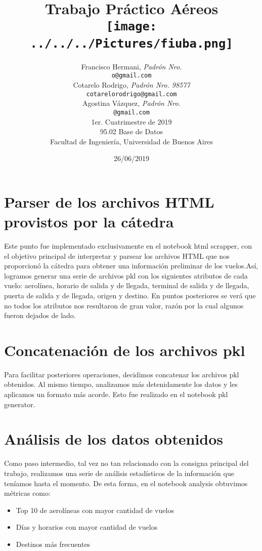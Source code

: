 \documentclass[a4paper,11pt]{article}
\title{\textbf{Trabajo Práctico Aéreos} \\[1cm] \texttt{[image: ../../../Pictures/fiuba.png]}}
\author{	Francisco Hermani, \textit{Padrón Nro. }                     \\
            \texttt{ o@gmail.com }                                              \\[2.5ex]
            Cotarelo Rodrigo, \textit{Padrón Nro. 98577}                     \\
            \texttt{ cotarelorodrigo@gmail.com }                                              \\[2.5ex]
			Agostina Vázquez, \textit{Padrón Nro. }                    
\\
            \texttt{ @gmail.com }                                              \\[2.5ex]
            \normalsize{1er. Cuatrimestre de 2019}                                      \\
            \normalsize{95.02 Base de Datos}  \\
            \normalsize{Facultad de Ingeniería, Universidad de Buenos Aires}            \\
       }
\date{26/06/2019}
\begin{document}
\maketitle
\thispagestyle{empty}   %
\newpage

\section{Parser de los archivos HTML provistos por la cátedra}
Este punto fue implementado exclusivamente en el notebook html scrapper, con el objetivo principal de interpretar y parsear los archivos HTML que nos proporcionó la cátedra para obtener una información preliminar de los vuelos.Así, logramos generar una serie de archivos pkl con los siguientes atributos de cada vuelo: aerolínea, horario de salida y de llegada, terminal de salida y de llegada, puerta de salida y de llegada, origen y destino. En puntos posteriores se verá que no todos los atributos nos resultaron de gran valor, razón por la cual algunos fueron dejados de lado.

\section{Concatenación de los archivos pkl}
Para facilitar posteriores operaciones, decidimos concatenar los archivos pkl obtenidos. Al mismo tiempo, analizamos más detenidamente los datos y les aplicamos un formato más acorde.
Esto fue realizado en el notebook pkl generator.

\section{Análisis de los datos obtenidos}
Como paso intermedio, tal vez no tan relacionado con la consigna principal del trabajo, realizamos una serie de análisis estadísticos de la información que teníamos hasta el momento.
De esta forma, en el notebook analysis obtuvimos métricas como:
\begin{itemize}
\item Top 10 de aerolíneas con mayor cantidad de vuelos

\item Días y horarios con mayor cantidad de vuelos

\item Destinos más frecuentes
\end{itemize}
\end{document}
